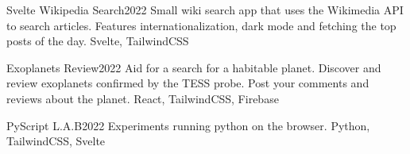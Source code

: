 %
%
%


\begin{projects}
	\project
	{Svelte Wikipedia Search}{2022}
	{  }
	{Small wiki search app that uses the Wikimedia API to search articles. Features internationalization, dark mode and fetching the top posts of the day.}
	{Svelte, TailwindCSS}
				
	\project
	{Exoplanets Review}{2022}
	{  }
	{Aid for a search for a habitable planet. Discover and review exoplanets confirmed by the TESS probe. Post your comments and reviews about the planet.}
	{React, TailwindCSS, Firebase}

    \project
	{PyScript L.A.B}{2022}
	{  }
	{Experiments running python on the browser.}
	{Python, TailwindCSS, Svelte}

\end{projects}